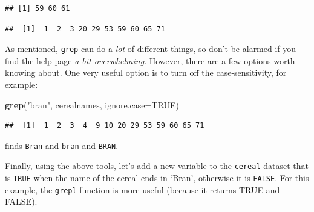\documentclass[]{book}
\newenvironment{Shaded}{\begin{snugshade}}{\end{snugshade}}
\newcommand{\CommentTok}[1]{\textcolor[rgb]{0.56,0.35,0.01}{\textit{#1}}}
\newcommand{\DataTypeTok}[1]{\textcolor[rgb]{0.13,0.29,0.53}{#1}}
\newcommand{\KeywordTok}[1]{\textcolor[rgb]{0.13,0.29,0.53}{\textbf{#1}}}
\newcommand{\NormalTok}[1]{#1}
\newcommand{\OperatorTok}[1]{\textcolor[rgb]{0.81,0.36,0.00}{\textbf{#1}}}
\newcommand{\OtherTok}[1]{\textcolor[rgb]{0.56,0.35,0.01}{#1}}
\newcommand{\StringTok}[1]{\textcolor[rgb]{0.31,0.60,0.02}{#1}}
\begin{document}
\begin{verbatim}
## [1] 59 60 61
\end{verbatim}

\begin{Shaded}
\end{Shaded}

\begin{verbatim}
##  [1]  1  2  3 20 29 53 59 60 65 71
\end{verbatim}

As mentioned, \texttt{grep} can do a \emph{lot} of different things, so don't be alarmed if you find the help page \emph{a bit overwhelming}. However, there are a few options worth knowing about. One very useful option is to turn off the case-sensitivity, for example:

\begin{Shaded}
\begin{Highlighting}[]
\KeywordTok{grep}\NormalTok{(}\StringTok{"bran"}\NormalTok{, cerealnames, }\DataTypeTok{ignore.case=}\OtherTok{TRUE}\NormalTok{)}
\end{Highlighting}
\end{Shaded}

\begin{verbatim}
##  [1]  1  2  3  4  9 10 20 29 53 59 60 65 71
\end{verbatim}

finds \texttt{Bran} and \texttt{bran} and \texttt{BRAN}.

Finally, using the above tools, let's add a new variable to the \texttt{cereal} dataset that is \texttt{TRUE} when the name of the cereal ends in `Bran', otherwise it is \texttt{FALSE}. For this example, the \texttt{grepl} function is more useful (because it returns TRUE and FALSE).

\begin{Shaded}
\end{Shaded}
\end{document}
